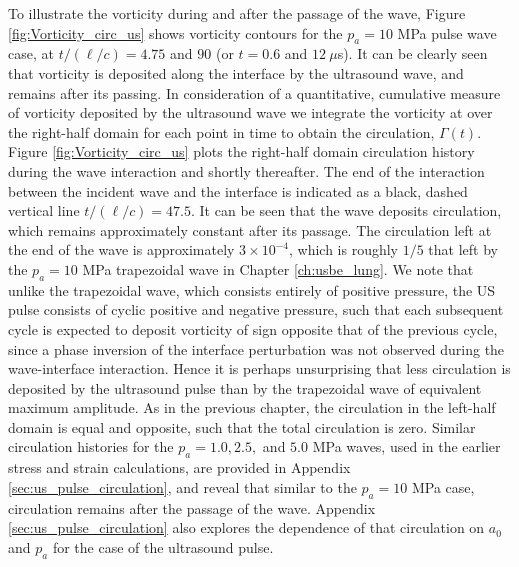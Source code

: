 To illustrate the vorticity during and after the passage of the wave,
Figure \ref{fig:Vorticity_circ_us}
shows vorticity contours for the $p_a = 10$ MPa pulse wave case, at
$t/(\ell/c) = 4.75$ and $90$ (or $t = 0.6 $ and $12~\mu$s). It can be
clearly seen that vorticity is deposited along the interface by the
ultrasound wave, and remains after its passing. In consideration of a
quantitative, cumulative measure of vorticity deposited by the
ultrasound wave we integrate the vorticity at over the right-half
domain for each point in time to obtain the circulation,
$\Gamma(t)$. Figure
\ref{fig:Vorticity_circ_us} plots
the right-half domain circulation history during the wave interaction
and shortly thereafter. The end of the interaction between the
incident wave and the interface is indicated as a black, dashed
vertical line $t/(\ell/c) = 47.5$. It can be seen that the wave
deposits circulation, which remains approximately constant after its
passage. The circulation left at the end of the wave is approximately
$3 \times 10^{-4}$, which is roughly $1/5$ that left by the $p_a = 10$
MPa trapezoidal wave in Chapter \ref{ch:usbe_lung}. We note that
unlike the trapezoidal wave, which consists entirely of positive
pressure, the \ac{US} pulse consists of cyclic positive and negative
pressure, such that each subsequent cycle is expected to deposit
vorticity of sign opposite that of the previous cycle, since a phase
inversion of the interface perturbation was not observed during the
wave-interface interaction. Hence it is perhaps unsurprising that less
circulation is deposited by the ultrasound pulse than by the
trapezoidal wave of equivalent maximum amplitude. As in the previous
chapter, the circulation in the left-half domain is equal and opposite,
such that the total circulation is zero. Similar circulation histories
for the $p_a = 1.0, 2.5,$ and $5.0$ MPa waves, used in the earlier
stress and strain calculations, are provided in Appendix
\ref{sec:us_pulse_circulation}, and reveal that similar to the
$p_a = 10$ MPa case, circulation remains after the passage of the
wave. Appendix \ref{sec:us_pulse_circulation} also explores the
dependence of that circulation on $a_0$ and $p_a$ for the case of the
ultrasound pulse.%
